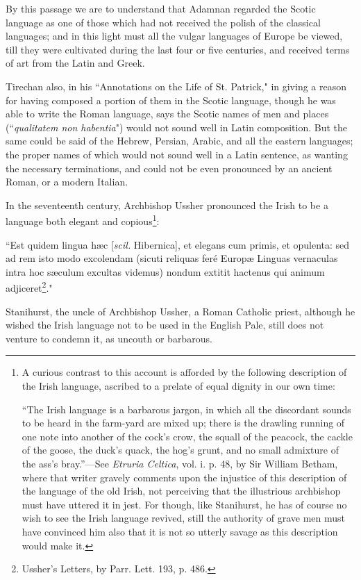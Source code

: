 \documentclass[11pt,oneside]{memoir}
\begin{document}
By this passage we are to understand that Adamnan regarded the Scotic language as one of those which had not received the polish of the classical languages; and in this light must all the vulgar languages of Europe be viewed, till they were cultivated during the last four or five centuries, and received terms of art from the Latin and Greek. 

Tirechan also, in his ``Annotations on the Life of St. Patrick," in giving a reason for having composed a portion of them in the Scotic language, though he was able to write the Roman language, says the Scotic names of men and places (``\textit{qualitatem non habentia}") would not sound well in Latin composition.
But the same could be said of the Hebrew, Persian, Arabic, and all the eastern languages; the proper names of which would not sound well in a Latin sentence, as wanting the necessary terminations, and could not be even pronounced by an ancient Roman, or a modern Italian.

In  the  seventeenth  century,  Archbishop  Ussher  pronounced the Irish to be a language both elegant and copious\footnote{
    A curious contrast to this account is afforded by the following description of the Irish language, ascribed to a prelate of equal dignity in our own time:

    ``The Irish language is a barbarous jargon, in which all the discordant sounds to be heard in the farm-yard are mixed up;
    there is the drawling running of one note into another of the cock's crow, the squall of the peacock, the cackle of the goose, the duck's quack, the hog's grunt, and no small admixture of the ass's bray.''---See \textit{Etruria Celtica}, vol. i. p. 48, by Sir William Betham, where that writer gravely comments upon the injustice of this description of the language of the old Irish, not perceiving that the illustrious archbishop must have uttered it in jest.
    For though, like Stanihurst, he has of course no wish to see the Irish language revived, still the authority of grave men must have convinced him also that it is not so utterly savage as this description would make it.
}:

``Est quidem lingua hæc [\textit{scil.} Hibernica], et elegans cum primis, et opulenta: sed ad rem isto modo excolendam (sicuti reliquas feré Europæ Linguas vernaculas intra hoc sæculum excultas videmus) nondum extitit hactenus qui animum adjiceret\footnote{
    Ussher's Letters, by Parr. Lett. 193, p. 486.
}." 

Stanihurst, the uncle of Archbishop Ussher, a Roman Catholic priest, although he wished the Irish language not to be used in the English Pale, still does not venture to condemn it, as uncouth or barbarous.
\end{document}
